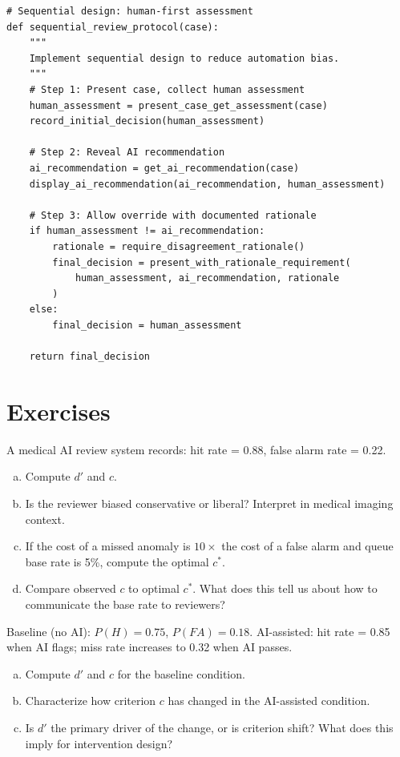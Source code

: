 \begin{lstlisting}[style=python, caption={Sequential design decision flow}]
# Sequential design: human-first assessment
def sequential_review_protocol(case):
    """
    Implement sequential design to reduce automation bias.
    """
    # Step 1: Present case, collect human assessment
    human_assessment = present_case_get_assessment(case)
    record_initial_decision(human_assessment)

    # Step 2: Reveal AI recommendation
    ai_recommendation = get_ai_recommendation(case)
    display_ai_recommendation(ai_recommendation, human_assessment)

    # Step 3: Allow override with documented rationale
    if human_assessment != ai_recommendation:
        rationale = require_disagreement_rationale()
        final_decision = present_with_rationale_requirement(
            human_assessment, ai_recommendation, rationale
        )
    else:
        final_decision = human_assessment

    return final_decision
\end{lstlisting}

\section{Exercises}

\begin{Exercise}
A medical AI review system records: hit rate = 0.88, false alarm rate = 0.22.
\begin{enumerate}[(a)]
    \item Compute $d'$ and $c$.
    \item Is the reviewer biased conservative or liberal? Interpret in medical imaging context.
    \item If the cost of a missed anomaly is $10\times$ the cost of a false alarm and queue base rate is 5\%, compute the optimal $c^*$.
    \item Compare observed $c$ to optimal $c^*$. What does this tell us about how to communicate the base rate to reviewers?
\end{enumerate}
\end{Exercise}

\begin{Exercise}
Baseline (no AI): $P(H) = 0.75$, $P(FA) = 0.18$. AI-assisted: hit rate = 0.85 when AI flags; miss rate increases to 0.32 when AI passes.
\begin{enumerate}[(a)]
    \item Compute $d'$ and $c$ for the baseline condition.
    \item Characterize how criterion $c$ has changed in the AI-assisted condition.
    \item Is $d'$ the primary driver of the change, or is criterion shift? What does this imply for intervention design?
\end{enumerate}
\end{Exercise}

